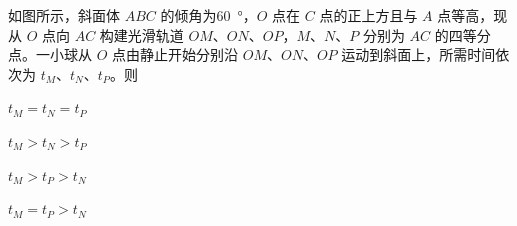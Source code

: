 如图所示，斜面体 \(ABC\) 的倾角为\qty{60}{\degree}，\(O\) 点在 \(C\) 点的正上方且与 \(A\) 点等高，现从 \(O\) 点向 \(AC\) 构建光滑轨道 \(OM\)、\(ON\)、\(OP\)，\(M\)、\(N\)、\(P\) 分别为 \(AC\) 的四等分点。一小球从 \(O\) 点由静止开始分别沿 \(OM\)、\(ON\)、\(OP\) 运动到斜面上，所需时间依次为 \(t_M\)、\(t_N\)、\(t_P\)。则\paren[]

\begin{choices}
	\item \(t_M = t_N = t_P\)
	\item \(t_M > t_N > t_P\)
	\item \(t_M > t_P > t_N\)
	\item \(t_M = t_P > t_N\)
\end{choices}
\begin{answer}
    
\end{answer}